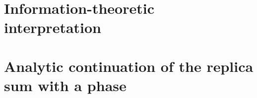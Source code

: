 \documentclass[11pt]{article}
\newcommand{\eps}{\varepsilon}
\begin{document}



  \section{Information-theoretic interpretation}

  \appendix
\section{Analytic continuation of the replica sum with a phase}
\label{app:analytic-continuation}
\end{document}
